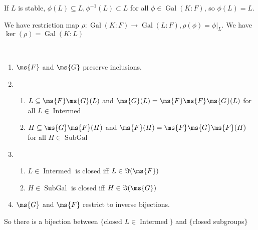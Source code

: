 \documentclass[x11names,reqno,14pt]{extarticle}
\DeclareMathOperator{\Gal}{Gal}
\DeclareMathOperator{\Intermed}{Intermed}
\DeclareMathOperator{\SubGal}{SubGal}
\begin{document}
If $L$ is stable, $\phi(L)\subseteq L, \phi^{-1}(L)\subset L$ for all $\phi\in\Gal(K:F)$, so $\phi(L) = L$.

We have restriction map $\rho:\Gal(K:F)\to\Gal(L:F), \rho(\phi) = \phi|_L$. We have $\ker(\rho) = \Gal(K:L)$

\prop\,

\begin{enumerate}

\item $\ms{F}$ and $\ms{G}$ preserve inclusions.

\item 

\begin{enumerate}[label=(\alph*)] 

\item $L \subseteq \ms{F}\ms{G}(L)$ and $\ms{G}(L) = \ms{F}\ms{F}\ms{G}(L)$ for all $L \in \Intermed$

\item $H \subseteq \ms{G}\ms{F}(H)$ and $\ms{F}(H) = \ms{F}\ms{G}\ms{F}(H)$ for all $H \in \SubGal$

\end{enumerate}

\item

\begin{enumerate}[label=(\alph*)]

\item $L \in \Intermed$ is closed iff $L \in \Im(\ms{F})$

\item $H \in \SubGal$ is closed iff $H \in \Im(\ms{G})$

\end{enumerate}

\item $\ms{G}$ and $\ms{F}$ restrict to inverse bijections.

\end{enumerate}

So there is a bijection between $\{\text{closed }L \in \Intermed\}$ and $\{$closed subgroups$\}$

\prop\,
\end{document}
